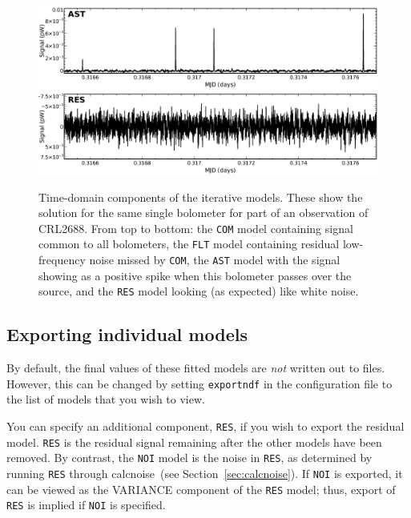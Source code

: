 \documentclass[twoside,11pt]{article}
\newcommand{\xref}[3]{#1}
\newcommand{\xlabel}[1]{}
\renewcommand{\_}{\texttt{\symbol{95}}}
\newcommand{\task}[1]{\textsf{#1}}
\newcommand{\calcnoise}{\xref{\task{calcnoise}}{sun258}{CALCNOISE}}
\begin{document}
\begin{figure}
\begin{center}
\begin{htmlonly}
  \includegraphics[width=136mm]{sc21_ast.eps} \\
  \includegraphics[width=136mm]{sc21_res.eps} \\
\end{htmlonly}
\caption{\small Time-domain components of the iterative models. These
show the solution for the same single bolometer for part of an
observation of CRL2688. From top to bottom: the \texttt{COM} model
containing signal common to all bolometers, the \texttt{FLT} model
containing residual low-frequency noise missed by \texttt{COM}, the
\texttt{AST} model with the signal showing as a positive spike when
this bolometer passes over the source, and the \texttt{RES} model
looking (as expected) like white noise.}
\label{fig:itercomp}
\end{center}
\end{figure}



\subsection{\xlabel{export}Exporting individual models}
\label{sec:export}

By default, the final values of these fitted models are {\em not}
written out to files. However, this can be changed by setting
\texttt{exportndf} in the configuration file to the list of models
that you wish to view.

You can specify an additional component, \texttt{RES}, if you wish to
export the residual model. \texttt{RES} is the residual signal
remaining after the other models have been removed. By contrast, the
\texttt{NOI} model is the noise in \texttt{RES}, as determined by
running \texttt{RES} through \calcnoise\ (see
Section~\ref{sec:calcnoise}). If \texttt{NOI} is exported, it can be
viewed as the VARIANCE component of the \texttt{RES} model; thus,
export of \texttt{RES} is implied if \texttt{NOI} is specified.
\end{document}
